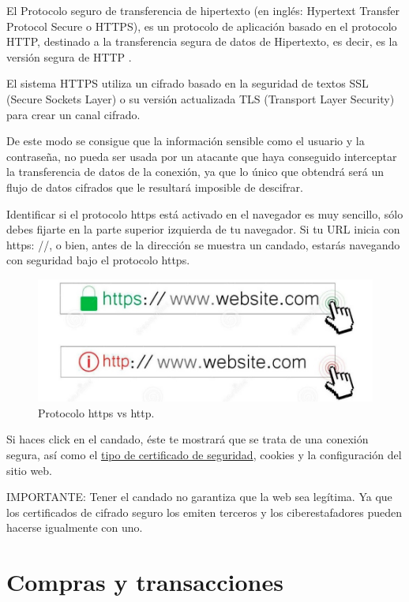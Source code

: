 \documentclass[
  spanish,
  a4paper,
  openany]{book}
\begin{document}
El Protocolo seguro de transferencia de hipertexto (en inglés: Hypertext Transfer Protocol Secure o HTTPS), es un protocolo de aplicación basado en el protocolo HTTP, destinado a la transferencia segura de datos de Hipertexto, es decir, es la versión segura de HTTP \citep{WIKI-https}.

El sistema HTTPS utiliza un cifrado basado en la seguridad de textos SSL (Secure Sockets Layer) o su versión actualizada TLS (Transport Layer Security) para crear un canal cifrado.

De este modo se consigue que la información sensible como el usuario y la contraseña, no pueda ser usada por un atacante que haya conseguido interceptar la transferencia de datos de la conexión, ya que lo único que obtendrá será un flujo de datos cifrados que le resultará imposible de descifrar.

Identificar si el protocolo https está activado en el navegador es muy sencillo, sólo debes fijarte en la parte superior izquierda de tu navegador. Si tu URL inicia con https: //, o bien, antes de la dirección se muestra un candado, estarás navegando con seguridad bajo el protocolo https.

\begin{figure}

{\centering \includegraphics[width=0.75\linewidth]{images/protocolo-https-http} 

}

\caption{Protocolo https vs http.}\label{fig:unnamed-chunk-10}
\end{figure}

Si haces click en el candado, éste te mostrará que se trata de una conexión segura, así como el \href{https://www.softrending.com/blog/hosting/tipos-diferencias-certificado-seguridad-ssl}{tipo de certificado de seguridad}, cookies y la configuración del sitio web.

IMPORTANTE: Tener el candado no garantiza que la web sea legítima. Ya que los certificados de cifrado seguro los emiten terceros y los ciberestafadores pueden hacerse igualmente con uno.

\hypertarget{compras-y-transacciones}{%
\section{Compras y transacciones}\label{compras-y-transacciones}}
\end{document}
